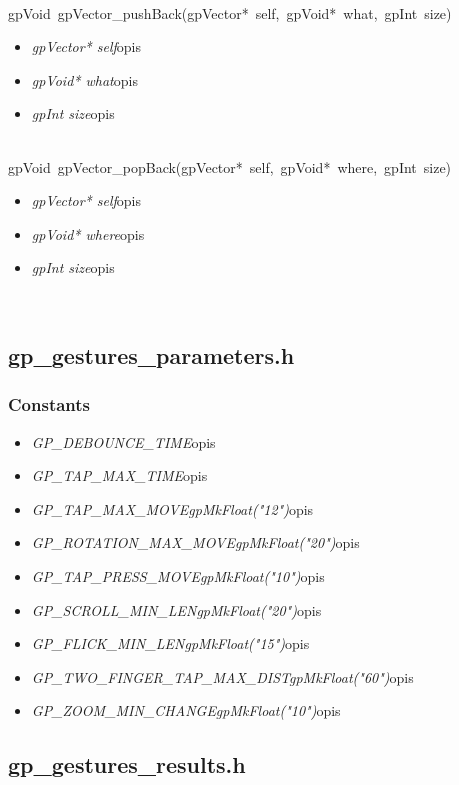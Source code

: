  \ \\
\mbox{\textsf{gpVoid gpVector_pushBack(gpVector* self, gpVoid* what, gpInt size)}}
	\begin{itemize}
		\item \textit{gpVector* self}\quad opis
		\item \textit{gpVoid* what}\quad opis
		\item \textit{gpInt size}\quad opis
	\end{itemize}

 \ \\
\mbox{\textsf{gpVoid gpVector_popBack(gpVector* self, gpVoid* where, gpInt size)}}
	\begin{itemize}
		\item \textit{gpVector* self}\quad opis
		\item \textit{gpVoid* where}\quad opis
		\item \textit{gpInt size}\quad opis
	\end{itemize}

 \ \\

\subsection{gp_gestures_parameters.h}
\subsubsection{Constants}
\begin{itemize}
\item \textit{GP_DEBOUNCE_TIME}\qquad opis
\item \textit{GP_TAP_MAX_TIME}\qquad opis
\item \textit{GP_TAP_MAX_MOVE\quad gpMkFloat("12")}\qquad opis
\item \textit{GP_ROTATION_MAX_MOVE\quad gpMkFloat("20")}\qquad opis
\item \textit{GP_TAP_PRESS_MOVE\quad gpMkFloat("10")}\qquad opis
\item \textit{GP_SCROLL_MIN_LEN\quad gpMkFloat("20")}\qquad opis
\item \textit{GP_FLICK_MIN_LEN\quad gpMkFloat("15")}\qquad opis
\item \textit{GP_TWO_FINGER_TAP_MAX_DIST\quad gpMkFloat("60")}\qquad opis
\item \textit{GP_ZOOM_MIN_CHANGE\quad gpMkFloat("10")}\qquad opis
\end{itemize}

\subsection{gp_gestures_results.h}
